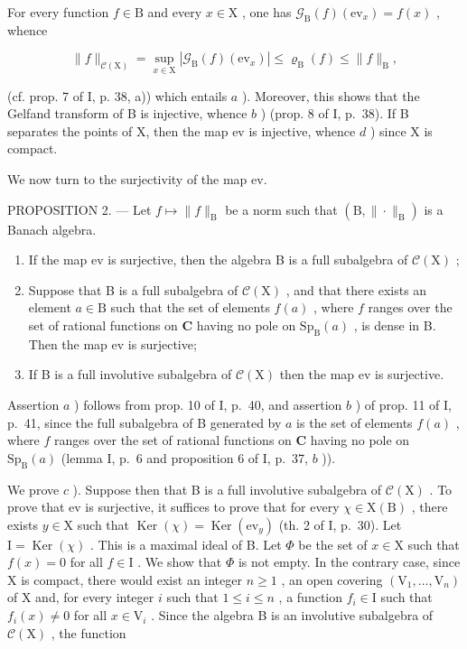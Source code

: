 For every function \(f \in \mathrm{B}\) and every \(x \in \mathrm{X}\) , one has \(\mathcal{G}_{\mathrm{B}}(f)(\mathrm{ev}_x) = f(x)\) , whence

\[
\| f \| _ {\mathcal {C} (\mathrm{X})} = \sup _ {x \in \mathrm{X}} | \mathcal {G} _ {\mathrm{B}} (f) (\mathrm{ev} _ {x}) | \leqslant \varrho_ {\mathrm{B}} (f) \leqslant \| f \| _ {\mathrm{B}},
\]

(cf. prop. 7 of I, p. 38, a)) which entails \(a\) ). Moreover, this shows that the Gelfand transform of B is injective, whence \(b\) ) (prop. 8 of I, p.~38). If B separates the points of X, then the map ev is injective, whence \(d\) ) since X is compact.

We now turn to the surjectivity of the map ev.

PROPOSITION 2. --- Let \(f \mapsto \|f\|_{\mathrm{B}}\) be a norm such that \((\mathrm{B}, \| \cdot \|_{\mathrm{B}})\) is a Banach algebra.

\begin{enumerate}
\def\labelenumi{\alph{enumi})}
\item
  If the map ev is surjective, then the algebra B is a full subalgebra of \(\mathcal{C}(\mathrm{X})\) ;
\item
  Suppose that B is a full subalgebra of \(\mathcal{C}(\mathrm{X})\) , and that there exists an element \(a \in \mathrm{B}\) such that the set of elements \(f(a)\) , where \(f\) ranges over the set of rational functions on \(\mathbf{C}\) having no pole on \(\mathrm{Sp}_{\mathrm{B}}(a)\) , is dense in B. Then the map ev is surjective;
\item
  If B is a full involutive subalgebra of \(\mathcal{C}(\mathrm{X})\) then the map ev is surjective.
\end{enumerate}

Assertion \(a\) ) follows from prop. 10 of I, p.~40, and assertion \(b\) ) of prop. 11 of I, p.~41, since the full subalgebra of B generated by \(a\) is the set of elements \(f(a)\) , where \(f\) ranges over the set of rational functions on \(\mathbf{C}\) having no pole on \(\mathrm{Sp}_{\mathrm{B}}(a)\) (lemma I, p.~6 and proposition 6 of I, p.~37, \(b\) )).

We prove \(c\) ). Suppose then that B is a full involutive subalgebra of \(\mathcal{C}(\mathrm{X})\) . To prove that ev is surjective, it suffices to prove that for every \(\chi \in \mathrm{X}(\mathrm{B})\) , there exists \(y \in \mathrm{X}\) such that \(\operatorname{Ker}(\chi) = \operatorname{Ker}(\mathrm{ev}_y)\) (th. 2 of I, p.~30). Let \(\mathrm{I} = \operatorname{Ker}(\chi)\) . This is a maximal ideal of B. Let \(\Phi\) be the set of \(x \in \mathrm{X}\) such that \(f(x) = 0\) for all \(f \in \mathrm{I}\) . We show that \(\Phi\) is not empty. In the contrary case, since X is compact, there would exist an integer \(n \geqslant 1\) , an open covering \((\mathrm{V}_1, \ldots, \mathrm{V}_n)\) of X and, for every integer \(i\) such that \(1 \leqslant i \leqslant n\) , a function \(f_i \in \mathrm{I}\) such that \(f_i(x) \neq 0\) for all \(x \in \mathrm{V}_i\) . Since the algebra B is an involutive subalgebra of \(\mathcal{C}(\mathrm{X})\) , the function

